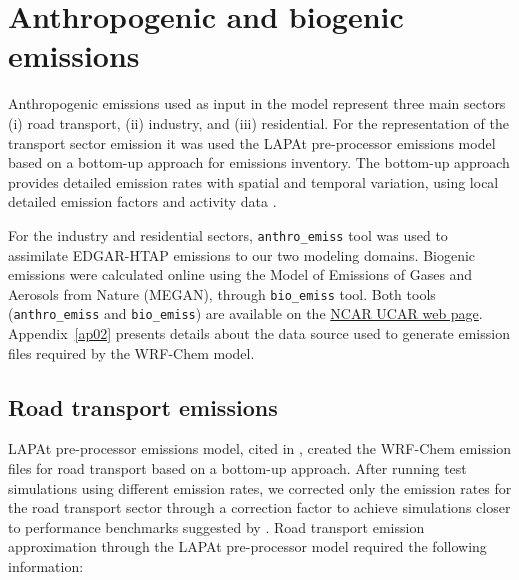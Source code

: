 	\section{Anthropogenic and biogenic emissions}
	Anthropogenic emissions used as input in the model represent three main sectors (i) road transport, (ii) industry, and (iii) residential.
	For the representation of the transport sector emission it was used the LAPAt pre-processor emissions model \citep{Andrade2015} based on a bottom-up approach for emissions inventory.
	The bottom-up approach provides detailed emission rates with spatial and temporal variation, using local detailed emission factors and activity data \citep{Wang2009}.
	
	For the industry and residential sectors, \verb|anthro_emiss| tool \citep{Kumar2020} was used to assimilate EDGAR-HTAP emissions to our two modeling domains.
	Biogenic emissions were calculated online using the Model of Emissions of Gases and Aerosols from Nature (MEGAN), through \verb|bio_emiss| tool.
	Both tools (\verb|anthro_emiss| and \verb|bio_emiss|) are available on the \href{https://www.acom.ucar.edu/wrf-chem/download.shtml}{NCAR UCAR web page}.
	Appendix~\ref{ap02} presents details about the data source used to generate emission files required by the WRF-Chem model.
	
		\subsection{Road transport emissions}
		
		LAPAt pre-processor emissions model, cited in \citet{Andrade2015}, created the WRF-Chem emission files for road transport based on a bottom-up approach. 
		After running test simulations using different emission rates, we corrected only the emission rates for the road transport sector through a correction factor to achieve simulations closer to performance benchmarks suggested by \citet{Emery2017}.	
		Road transport emission approximation through the LAPAt pre-processor model required the following information:
		
